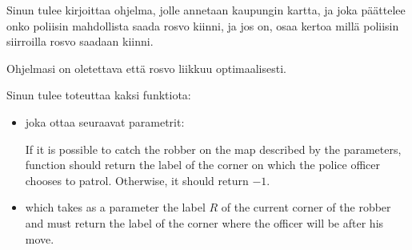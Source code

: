 \documentclass{boi2014-fi}
\begin{document}
    \Task
    Sinun tulee kirjoittaa ohjelma, jolle annetaan kaupungin kartta, ja joka
    päättelee onko poliisin mahdollista saada rosvo kiinni, ja jos on, osaa
    kertoa millä poliisin siirroilla rosvo saadaan kiinni.
    
    Ohjelmasi on oletettava että rosvo liikkuu optimaalisesti.

    \Implementation
    Sinun tulee toteuttaa kaksi funktiota:
    \begin{itemize}
        \item {} joka ottaa seuraavat parametrit:

        If it is possible to catch the robber on the map described
        by the parameters, function  should return the
        label of the corner on which the police officer chooses to patrol.
        Otherwise, it should return $-1$.

        \item {} which takes as a
            parameter the label $R$ of the current corner of the robber
            and must return the label of the corner where the officer
            will be after his move.
    \end{itemize}
\end{document}
